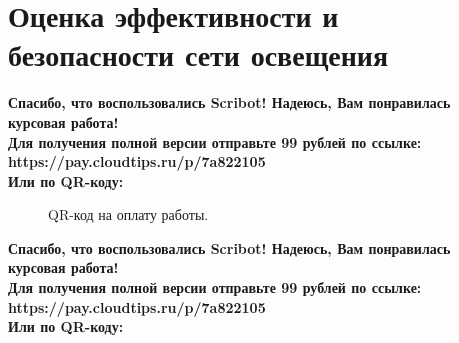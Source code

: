 \documentclass{article}
\begin{document}
\section{Оценка эффективности и безопасности сети освещения}
\begin{center}
    \textbf{
        Спасибо, что воспользовались Scribot! Надеюсь, Вам понравилась курсовая работа!\\
        Для получения полной версии отправьте 99 рублей по ссылке:\\
        https://pay.cloudtips.ru/p/7a822105\\
        Или по QR-коду:\\
    }
\end{center}
\begin{figure}[h]
    \caption{QR-код на оплату работы.}
    \label{ris:image}
\end{figure}
\newpage
\begin{center}
    \textbf{
        Спасибо, что воспользовались Scribot! Надеюсь, Вам понравилась курсовая работа!\\
        Для получения полной версии отправьте 99 рублей по ссылке:\\
        https://pay.cloudtips.ru/p/7a822105\\
        Или по QR-коду:\\
    }
\end{center}
\end{document}
